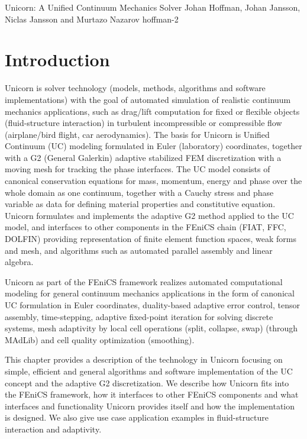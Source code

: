               {Unicorn: A Unified Continuum Mechanics Solver}
              {Johan Hoffman, Johan Jansson, Niclas Jansson and Murtazo Nazarov}
              {hoffman-2}

\section{Introduction}

Unicorn is solver technology (models, methods, algorithms and software
implementations) with the goal of automated simulation of realistic
continuum mechanics applications, such as drag/lift computation for
fixed or flexible objects (fluid-structure interaction) in turbulent
incompressible or compressible flow (airplane/bird flight, car
aerodynamics). The basis for Unicorn is Unified Continuum (UC)
modeling formulated in Euler (laboratory) coordinates, together with a
G2 (General Galerkin) adaptive stabilized FEM discretization with a
moving mesh for tracking the phase interfaces. The UC model consists
of canonical conservation equations for mass, momentum, energy and
phase over the whole domain as one continuum, together with a Cauchy
stress and phase variable as data for defining material properties and
constitutive equation. Unicorn formulates and implements the adaptive
G2 method applied to the UC model, and interfaces to other components
in the FEniCS chain (FIAT, FFC, DOLFIN) providing representation of
finite element function spaces, weak forms and mesh, and algorithms
such as automated parallel assembly and linear algebra.

Unicorn as part of the FEniCS framework realizes automated
computational modeling for general continuum mechanics applications in
the form of canonical UC formulation in Euler coordinates,
duality-based adaptive error control, tensor assembly, time-stepping,
adaptive fixed-point iteration for solving discrete systems, mesh
adaptivity by local cell operations (split, collapse, swap) (through
MAdLib) and cell quality optimization (smoothing).

This chapter provides a description of the technology in Unicorn
focusing on simple, efficient and general algorithms and software
implementation of the UC concept and the adaptive G2
discretization. We describe how Unicorn fits into the FEniCS
framework, how it interfaces to other FEniCS components and what
interfaces and functionality Unicorn provides itself and how the
implementation is designed. We also give use case application examples
in fluid-structure interaction and adaptivity.

